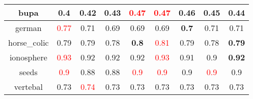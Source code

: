 \documentclass{article}%
\begin{document}
\begin{tabular}{c|cccccccc}
\hline%
bupa&0.4&\textbf{0.42}&0.43&\textcolor{red}{ 
0.47
}&\textcolor{red}{ 
0.47
}&0.46&\textbf{0.45}&0.44\\%
\hline%
german&\textcolor{red}{ 
0.77
}&0.71&0.69&0.69&0.69&\textbf{0.7}&0.71&0.71\\%
\hline%
horse\_colic&0.79&0.79&0.78&\textbf{0.8}&\textcolor{red}{ 
0.81
}&0.79&0.78&\textbf{0.79}\\%
\hline%
ionosphere&\textcolor{red}{ 
0.93
}&0.92&0.92&0.92&\textcolor{red}{ 
0.93
}&0.91&0.9&\textbf{0.92}\\%
\hline%
seeds&\textcolor{red}{ 
0.9
}&0.88&0.88&\textcolor{red}{ 
0.9
}&\textcolor{red}{ 
0.9
}&0.9&\textcolor{red}{ 
0.9
}&0.9\\%
\hline%
vertebal&0.73&\textcolor{red}{ 
0.74
}&0.73&0.73&0.73&0.73&0.73&0.73\\%
\hline%
\end{tabular}

%
\end{document}
